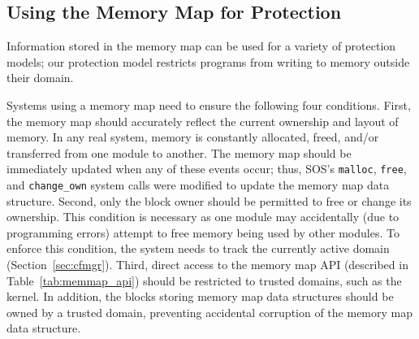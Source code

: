 \subsection{Using the Memory Map for Protection}
\label{sec:mmap_for_protection}
%
Information stored in the memory map can be used for a variety of protection models;
%
our protection model restricts programs from writing to memory outside their domain.
%
%


%
Systems using a memory map need to ensure the following four conditions.
%
First, the memory map should accurately reflect the current ownership and
layout of memory.
%
In any real system, memory is constantly allocated, freed, and/or
transferred from one module to another.
%
The memory map should be immediately updated when any of these events
occur; thus, SOS's
%
\texttt{malloc}, \texttt{free}, and
\texttt{change\_own} system calls were modified to update the memory
map data structure. 
%
Second, only the block owner should be permitted to free or change its ownership.
%
This condition is necessary as one module may accidentally (due to
programming errors) attempt to free memory being used by other
modules.
%
%
To enforce this condition, the system needs to track the currently
active domain (Section~\ref{sec:cfmgr}).
%
%
Third, direct access to the memory map API (described in Table~\ref{tab:memmap_api})
should be restricted to trusted domains, such as the kernel.
%
%
%
In addition, the blocks storing memory map data structures should be owned
by a trusted domain, preventing
%
accidental corruption of the memory map data structure.
%


